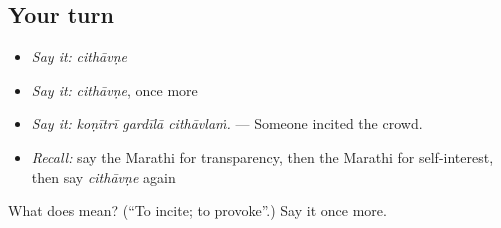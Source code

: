 \subsection*{Your turn}
\begin{itemize}
\raggedright
  \item \emph{Say it:} \emph{cithāvṇe}
  \item \emph{Say it:} \emph{cithāvṇe}, once more
  \item \emph{Say it:} \emph{koṇītrī gardīlā cithāvlaṁ.} — Someone incited the crowd.
  \item \emph{Recall:} say the Marathi for transparency, then the Marathi for self-interest, then say \emph{cithāvṇe} again
\end{itemize}

\begin{tcolorbox}[breakable,colback=teal!4,colframe=teal!35!black,title={Before you move on}]
What does  mean? (\textquotedblleft{}To incite; to provoke\textquotedblright{}.) Say it once more.
\end{tcolorbox}
